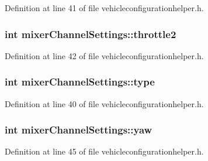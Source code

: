\-Definition at line 41 of file vehicleconfigurationhelper.\-h.

\hypertarget{group___vehicle_configuration_helper_gaaa198e94e22ad3c7474bef8972c5e73d}{
\subsubsection[{throttle2}]{\setlength{\rightskip}{0pt plus 5cm}int {\bf mixer\-Channel\-Settings\-::throttle2}}}\label{group___vehicle_configuration_helper_gaaa198e94e22ad3c7474bef8972c5e73d}


\-Definition at line 42 of file vehicleconfigurationhelper.\-h.

\hypertarget{group___vehicle_configuration_helper_gae266726733ea9753d4b40ababc4ed7dd}{
\subsubsection[{type}]{\setlength{\rightskip}{0pt plus 5cm}int {\bf mixer\-Channel\-Settings\-::type}}}\label{group___vehicle_configuration_helper_gae266726733ea9753d4b40ababc4ed7dd}


\-Definition at line 40 of file vehicleconfigurationhelper.\-h.

\hypertarget{group___vehicle_configuration_helper_ga16a724da7162ceb2c56798d864dac807}{
\subsubsection[{yaw}]{\setlength{\rightskip}{0pt plus 5cm}int {\bf mixer\-Channel\-Settings\-::yaw}}}\label{group___vehicle_configuration_helper_ga16a724da7162ceb2c56798d864dac807}


\-Definition at line 45 of file vehicleconfigurationhelper.\-h.




